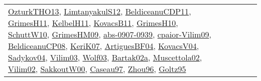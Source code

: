 {\begin{longtable}{lp{3cm}>{\raggedright}p{6cm}>{\raggedright}p{6cm}p{8cm}}
\href{articles/OzturkTHO13.pdf}{OzturkTHO13}\cite{OzturkTHO13}, \href{articles/LimtanyakulS12.pdf}{LimtanyakulS12}\cite{LimtanyakulS12}, \href{articles/BeldiceanuCDP11.pdf}{BeldiceanuCDP11}\cite{BeldiceanuCDP11}, \href{papers/GrimesH11.pdf}{GrimesH11}\cite{GrimesH11}, \href{articles/KelbelH11.pdf}{KelbelH11}\cite{KelbelH11}, \href{articles/KovacsB11.pdf}{KovacsB11}\cite{KovacsB11}, \href{papers/GrimesH10.pdf}{GrimesH10}\cite{GrimesH10}, \href{papers/SchuttW10.pdf}{SchuttW10}\cite{SchuttW10}, \href{papers/GrimesHM09.pdf}{GrimesHM09}\cite{GrimesHM09}, \href{articles/abs-0907-0939.pdf}{abs-0907-0939}\cite{abs-0907-0939}, \href{papers/cpaior-Vilim09.pdf}{cpaior-Vilim09}\cite{cpaior-Vilim09}, \href{papers/BeldiceanuCP08.pdf}{BeldiceanuCP08}\cite{BeldiceanuCP08}, \href{papers/KeriK07.pdf}{KeriK07}\cite{KeriK07}, \href{papers/ArtiguesBF04.pdf}{ArtiguesBF04}\cite{ArtiguesBF04}, \href{papers/KovacsV04.pdf}{KovacsV04}\cite{KovacsV04}, \href{papers/Sadykov04.pdf}{Sadykov04}\cite{Sadykov04}, \href{papers/Vilim03.pdf}{Vilim03}\cite{Vilim03}, \href{papers/Wolf03.pdf}{Wolf03}\cite{Wolf03}, \href{papers/Bartak02a.pdf}{Bartak02a}\cite{Bartak02a}, \href{papers/Muscettola02.pdf}{Muscettola02}\cite{Muscettola02}, \href{papers/Vilim02.pdf}{Vilim02}\cite{Vilim02}, \href{articles/SakkoutW00.pdf}{SakkoutW00}\cite{SakkoutW00}, \href{papers/Caseau97.pdf}{Caseau97}\cite{Caseau97}, \href{papers/Zhou96.pdf}{Zhou96}\cite{Zhou96}, \href{papers/Goltz95.pdf}{Goltz95}\cite{Goltz95}\\

\end{longtable}}
